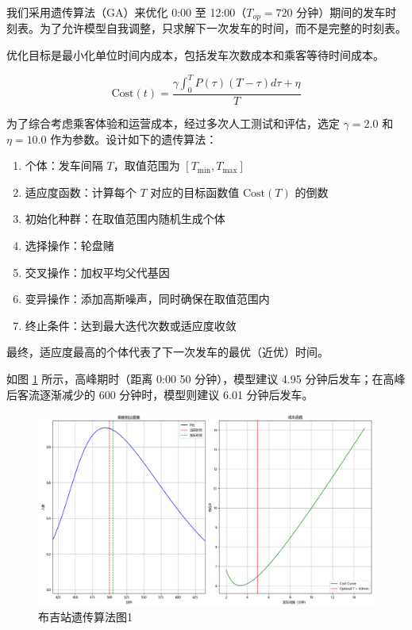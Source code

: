 
我们采用遗传算法（GA）\cite{HollandGA}来优化 0:00 至 12:00（$T_{op}=720$ 分钟）期间的发车时刻表。为了允许模型自我调整，只求解下一次发车的时间，而不是完整的时刻表。\cite{GoldbergGA}

优化目标是最小化单位时间内成本，包括发车次数成本和乘客等待时间成本。

$$
\text{Cost}(t) = \frac{\gamma \int _0 ^T P(\tau)(T-\tau)d\tau + \eta}{T}
$$

为了综合考虑乘客体验和运营成本，经过多次人工测试和评估，选定 $\gamma=2.0$ 和 $\eta=10.0$ 作为参数。设计如下的遗传算法：

\begin{enumerate}
    \item 个体：发车间隔 $T$，取值范围为 $[T_{\min}, T_{\max}]$
    \item 适应度函数：计算每个 $T$ 对应的目标函数值 $\text{Cost}(T)$ 的倒数
    \item 初始化种群：在取值范围内随机生成个体
    \item 选择操作：轮盘赌
    \item 交叉操作：加权平均父代基因
    \item 变异操作：添加高斯噪声，同时确保在取值范围内
    \item 终止条件：达到最大迭代次数或适应度收敛
\end{enumerate}

最终，适应度最高的个体代表了下一次发车的最优（近优）时间。

如图 \ref{fig:gaBuji1} 所示，高峰期时（距离 0:00 50 分钟），模型建议 4.95 分钟后发车；在高峰后客流逐渐减少的 600 分钟时，模型则建议 6.01 分钟后发车。

\begin{figure}[htbp]
    \centering
    \includegraphics[width=1.0\textwidth]{res/Figure_7.png}
    \caption{布吉站遗传算法图1}
    \label{fig:gaBuji1}
\end{figure}

